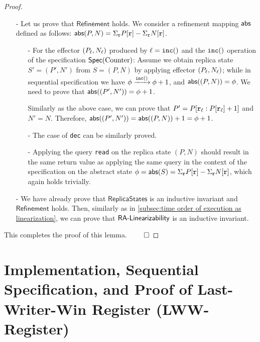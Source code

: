 \begin {proof}
\begin{itemize}
\item[-] Let us prove that $\mathsf{Refinement}$ holds. We consider a refinement mapping $\refmap$ defined as follows: $\refmap(P,N) = \Sigma_{\arep} P[\arep] - \Sigma_{\arep} N[\arep]$.

    \begin{itemize}
    \setlength{\itemsep}{0.5pt}
    \item[-] For the effector $(P_{\alabel},N_{\alabel})$ produced by $\alabel = \alabelshort[{\tt inc}]{}$ and the $\alabelshort[{\tt inc}]{}$ operation of the specification $\specCounter$: Assume we obtain replica state $S'=(P',N')$ from $S=(P,N)$ by applying effector $(P_{\alabel},N_{\alabel})$; while in sequential specification we have $\abstate \xrightarrow{\alabelshort[{\tt inc}]{}} \abstate+1$, and $\refmap((P,N)) = \abstate$. We need to prove that $\refmap((P',N')) = \abstate+1$.

        Similarly as the above case, we can prove that $P' = P[\arep_{\alabel}: P[\arep_{\alabel}]+1]$ and $N' = N$. Therefore, $\refmap((P',N')) = \refmap((P,N))+1 = \abstate+1$.

    \item[-] The case of {\tt dec} can be similarly proved.

    \item[-] Applying the query {\tt read} on the replica state $(P,N)$ should result in the same return value as applying the same query in the context of the specification on the abstract state $\abstate = \refmap(S) = \Sigma_{\arep} P[\arep] - \Sigma_{\arep} N[\arep]$, which again holds trivially.
    \end{itemize}

\item[-] We have already prove that $\mathsf{ReplicaStates}$ is an inductive invariant and $\mathsf{Refinement}$ holds. Then, similarly as in \sectionautorefname \ref{subsec:time order of execution as linearization}, we can prove that $\mathsf{\CRDTLinshort{}}$ is an inductive invariant.
\end{itemize}

This completes the proof of this lemma. $\qed$
\end {proof}








\section{Implementation, Sequential Specification, and Proof of Last-Writer-Win Register (LWW-Register)}
\label{sec:implementation, sequential specification, and proof of last-writer-win register (LWW-register)}



